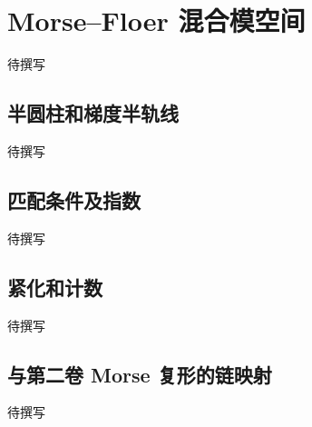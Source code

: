 
% 
% 

\section{Morse–Floer 混合模空间}
\label{g4:sec:2702}

待撰写

\subsection{半圆柱和梯度半轨线}
\label{g4:subsec:2702:01}
待撰写

\subsection{匹配条件及指数}
\label{g4:subsec:2702:02}
待撰写

\subsection{紧化和计数}
\label{g4:subsec:2702:03}
待撰写

\subsection{与第二卷 Morse 复形的链映射}
\label{g4:subsec:2702:04}
待撰写
